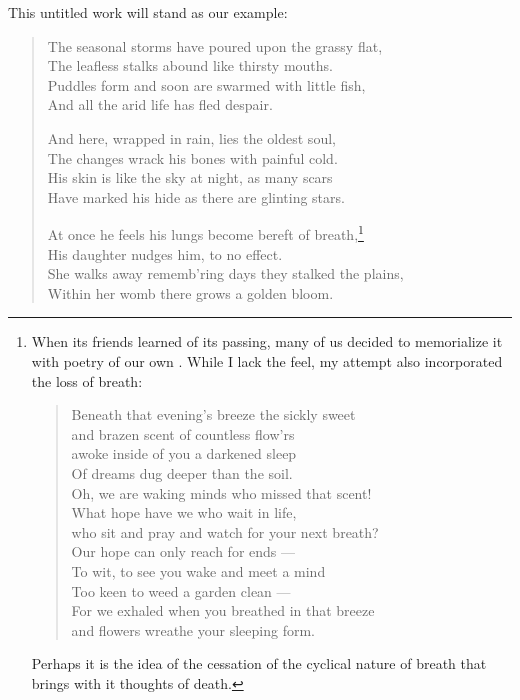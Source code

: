 \documentclass[12pt,oneside]{memoir}
\begin{document}
This untitled work will stand as our example:

\begin{verse}
The seasonal storms have poured upon the grassy flat, \\
The leafless stalks abound like thirsty mouths. \\
Puddles form and soon are swarmed with little fish, \\
And all the arid life has fled despair.

And here, wrapped in rain, lies the oldest soul, \\
The changes wrack his bones with painful cold. \\
His skin is like the sky at night, as many scars \\
Have marked his hide as there are glinting stars.

At once he feels his lungs become bereft of breath,\footnote{When its friends learned of its passing, many of us decided to memorialize it with poetry of our own \parencite{memorial}. While I lack the feel, my attempt also incorporated the loss of breath: \begin{verse}Beneath that evening's breeze the sickly sweet \\ \vin and brazen scent of countless flow'rs \\ awoke inside of you a darkened sleep \\ \vin Of dreams dug deeper than the soil. \\ Oh, we are waking minds who missed that scent! \\ \vin What hope have we who wait in life, \\ who sit and pray and watch for your next breath? \\ \vin Our hope can only reach for ends --- \\ To wit, to see you wake and meet a mind \\ \vin Too keen to weed a garden clean --- \\ For we exhaled when you breathed in that breeze \\ \vin and flowers wreathe your sleeping form.\end{verse} Perhaps it is the idea of the cessation of the cyclical nature of breath that brings with it thoughts of death.} \\
His daughter nudges him, to no effect. \\
She walks away rememb'ring days they stalked the plains, \\
Within her womb there grows a golden bloom.

\parencite[26]{leaves}
\end{verse}
\end{document}
